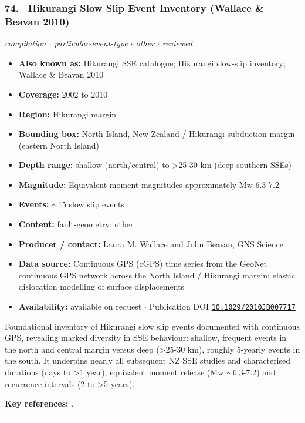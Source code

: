 \documentclass[10pt,a4paper]{article}
\newcommand{\catentryrule}{\par\vspace{3pt}\noindent\textcolor{rulegrey}{\rule{\linewidth}{0.3pt}}\par\vspace{5pt}}
\newcommand{\kv}[2]{\item \textbf{#1:} #2}
\begin{document}
\subsubsection*{\hypertarget{c:74}{74.}~ Hikurangi Slow Slip Event Inventory (Wallace \& Beavan 2010)}
{\small\itshape compilation $\cdot$ particular-event-type $\cdot$ other $\cdot$ reviewed}\par\vspace{2pt}
\begin{itemize}[leftmargin=1.3em,itemsep=0.6pt,topsep=1pt,parsep=0pt]
\kv{Also known as}{Hikurangi SSE catalogue; Hikurangi slow-slip inventory; Wallace \& Beavan 2010}
\kv{Coverage}{2002 to 2010}
\kv{Region}{Hikurangi margin}
\kv{Bounding box}{North Island, New Zealand / Hikurangi subduction margin (eastern North Island)}
\kv{Depth range}{shallow (north/central) to \textgreater{}25-30 km (deep southern SSEs)}
\kv{Magnitude}{Equivalent moment magnitudes approximately Mw 6.3-7.2}
\kv{Events}{$\sim$15 slow slip events}
\kv{Content}{fault-geometry; other}
\kv{Producer / contact}{Laura M. Wallace and John Beavan, GNS Science}
\kv{Data source}{Continuous GPS (cGPS) time series from the GeoNet continuous GPS network across the North Island / Hikurangi margin; elastic dislocation modelling of surface displacements}
\kv{Availability}{available on request $\cdot$ Publication DOI \href{https://doi.org/10.1029/2010JB007717}{\nolinkurl{10.1029/2010JB007717}}}
\end{itemize}
\par\vspace{2pt}Foundational inventory of Hikurangi slow slip events documented with continuous GPS, revealing marked diversity in SSE behaviour: shallow, frequent events in the north and central margin versus deep (\textgreater{}25-30 km), roughly 5-yearly events in the south. It underpins nearly all subsequent NZ SSE studies and characterised durations (days to \textgreater{}1 year), equivalent moment release (Mw $\sim$6.3-7.2) and recurrence intervals (2 to \textgreater{}5 years).
\par\vspace{2pt}\textbf{Key references:} \cite{Wallace2010}.
\catentryrule
\end{document}

